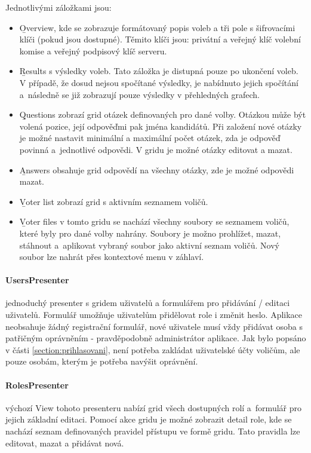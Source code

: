 Jednotlivými záložkami jsou:
\begin{itemize}
	\item \b{Overview}, kde se zobrazuje formátovaný popis voleb a tři pole s šifrovacími klíči (pokud jsou dostupné). Těmito klíči jsou: privátní a veřejný klíč volební komise a veřejný podpisový klíč serveru.
	\item \b{Results} s výsledky voleb. Tato záložka je distupná pouze po ukončení voleb. V případě, že dosud nejsou spočítané výsledky, je nabídnuto jejich spočítání a~následně se již zobrazují pouze výsledky v přehledných grafech.
	\item \b{Questions} zobrazí grid otázek definovaných pro dané volby. Otázkou může být volená pozice, její odpověďmi pak jména kandidátů. Při založení nové otázky je možné nastavit minimální a maximální počet otázek, zda je odpověď povinná a~jednotlivé odpovědi. V gridu je možné otázky editovat a mazat.
	
	\item \b{Answers} obsahuje grid odpovědí na všechny otázky, zde je možné odpovědi mazat.
	
	\item \b{Voter list} zobrazí grid s aktivním seznamem voličů.
	
	\item \b{Voter files} v tomto gridu se nachází všechny soubory se seznamem voličů, které byly pro dané volby nahrány. Soubory je možno prohlížet, mazat, stáhnout a~aplikovat vybraný soubor jako aktivní seznam voličů. Nový soubor lze nahrát přes kontextové menu v záhlaví.
	
\end{itemize}

\paragraph{UsersPresenter} jednoduchý presenter s gridem uživatelů a formulářem pro přidávání / editaci uživatelů. Formulář umožňuje uživatelům přidělovat role i změnit heslo. Aplikace neobsahuje žádný registrační formulář, nové uživatele musí vždy přidávat osoba s patřičným oprávněním - pravděpodobně administrátor aplikace. Jak bylo popsáno v části \ref{section:prihlasovani}, není potřeba zakládat uživatelské účty voličům, ale pouze osobám, kterým je potřeba navýšit oprávnění.

\paragraph{RolesPresenter} výchozí View tohoto presenteru nabízí grid všech dostupných rolí a~formulář pro jejich základní editaci. Pomocí akce gridu je možné zobrazit detail role, kde se nachází seznam definovaných pravidel přístupu ve formě gridu. Tato pravidla lze editovat, mazat a přidávat nová.

